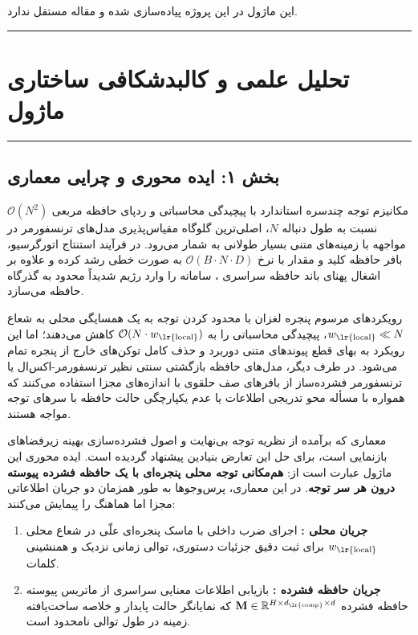 \clearpage
{}
\vspace*{0.2cm}

این ماژول در این پروژه پیاده‌سازی شده و مقاله مستقل ندارد.
\noindent\rule{\textwidth}{1.2pt}
\vspace*{0.1cm}
\section{تحلیل علمی و کالبدشکافی ساختاری ماژول }
\label{sec:mod_infini_attention}
\vspace*{-0.2cm}
\noindent\rule{\textwidth}{0.5pt}
\vspace*{0.3cm}

\subsection*{بخش ۱: ایده محوری و چرایی معماری }
مکانیزم توجه چندسره استاندارد  با پیچیدگی محاسباتی و ردپای حافظه مربعی $\mathcal{O}(N^2)$ نسبت به طول دنباله $N$، اصلی‌ترین گلوگاه مقیاس‌پذیری مدل‌های ترنسفورمر در مواجهه با زمینه‌های متنی بسیار طولانی به شمار می‌رود. در فرآیند استنتاج اتورگرسیو، بافر حافظه کلید و مقدار  با نرخ $\mathcal{O}(B \cdot N \cdot D)$ به صورت خطی رشد کرده و علاوه بر اشغال پهنای باند حافظه سراسری ، سامانه را وارد رژیم شدیداً محدود به گذرگاه حافظه  می‌سازد.

رویکردهای مرسوم پنجره لغزان  با محدود کردن توجه به یک همسایگی محلی به شعاع $w_{\text{\lr{local}}} \ll N$، پیچیدگی محاسباتی را به $\mathcal{O}(N \cdot w_{\text{\lr{local}}})$ کاهش می‌دهند؛ اما این رویکرد به بهای قطع پیوندهای متنی دوربرد و حذف کامل توکن‌های خارج از پنجره تمام می‌شود. در طرف دیگر، مدل‌های حافظه بازگشتی سنتی نظیر ترنسفورمر-اکس‌ال  یا ترنسفورمر فشرده‌ساز  از بافرهای صف حلقوی  با اندازه‌های مجزا استفاده می‌کنند که همواره با مسأله محو تدریجی اطلاعات یا عدم یکپارچگی حالت حافظه با سرهای توجه مواجه هستند.

معماری  که برآمده از نظریه توجه بی‌نهایت  و اصول فشرده‌سازی بهینه زیرفضاهای بازنمایی است، برای حل این تعارض بنیادین پیشنهاد گردیده است. ایده محوری این ماژول عبارت است از: \textbf{هم‌مکانی توجه محلی پنجره‌ای با یک حافظه فشرده پیوسته درون هر سر توجه}. در این معماری، پرس‌وجوها  به طور همزمان دو جریان اطلاعاتی مجزا اما هماهنگ را پیمایش می‌کنند:
\begin{enumerate}
    \item \textbf{جریان محلی :} اجرای ضرب داخلی با ماسک پنجره‌ای علّی در شعاع محلی $w_{\text{\lr{local}}}$ برای ثبت دقیق جزئیات دستوری، توالی زمانی نزدیک و همنشینی کلمات.
    \item \textbf{جریان حافظه فشرده :} بازیابی اطلاعات معنایی سراسری از ماتریس پیوسته حافظه فشرده $\mathbf{M} \in \mathbb{R}^{H \times d_{\text{\lr{comp}}} \times d}$ که نمایانگر حالت پایدار و خلاصه ساخت‌یافته زمینه در طول توالی نامحدود است.
\end{enumerate}


